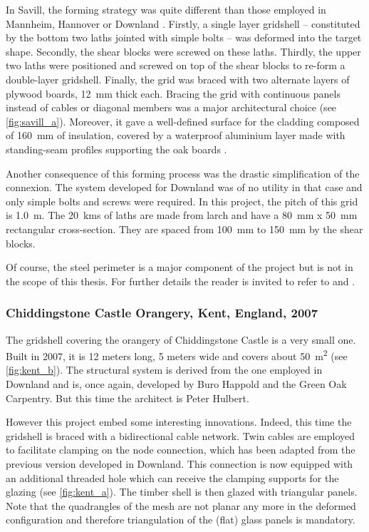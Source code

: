 In Savill, the forming strategy was quite different than those employed in Mannheim, Hannover or Downland \cite{Harris2008}. Firstly, a single layer gridshell -- constituted by the bottom two laths jointed with simple bolts -- was deformed into the target shape. Secondly, the shear blocks were screwed on these laths. Thirdly, the upper two laths were positioned and screwed on top of the shear blocks to re-form a double-layer gridshell. Finally, the grid was braced with two alternate layers of plywood boards, \SI{12}{mm} thick each. Bracing the grid with continuous panels instead of cables or diagonal members was a major architectural choice (see \cref{fig:savill_a}). Moreover, it gave a well-defined surface for the cladding composed of \SI{160}{mm} of insulation, covered by a waterproof aluminium layer made with standing-seam profiles supporting the oak boards \cite{Trada2006}.

Another consequence of this forming process was the drastic simplification of the connexion. The system developed for Downland was of no utility in that case and only simple bolts and screws were required. In this project, the pitch of this grid is \SI{1.0}{m}. The \SI{20}{kms} of laths are made from larch and have a \SI{80}{mm} x \SI{50}{mm} rectangular cross-section. They are spaced from \SI{100}{mm} to \SI{150}{mm} by the shear blocks.

Of course, the steel perimeter is a major component of the project but is not in the scope of this thesis. For further details the reader is invited to refer to \citet{Harris2008} and \citet{Trada2006}.

\subsubsection{Chiddingstone Castle Orangery, Kent, England, 2007}
The gridshell covering the orangery of Chiddingstone Castle is a very small one. Built in 2007, it is 12 meters long, 5 meters wide and covers about \SI{50}{m^2} (see \cref{fig:kent_b}). The structural system is derived from the one employed in Downland and is, once again, developed by Buro Happold and the Green Oak Carpentry. But this time the architect is Peter Hulbert.

However this project embed some interesting innovations. Indeed, this time the gridshell is braced with a bidirectional cable network. Twin cables are employed to facilitate clamping on the node connection, which has been adapted from the previous version developed in Downland. This connection is now equipped with an additional threaded hole which can receive the clamping supports for the glazing (see \cref{fig:kent_a}). The timber shell is then glazed with triangular panels. Note that the quadrangles of the mesh are not planar any more in the deformed configuration and therefore triangulation of the (flat) glass panels is mandatory.

